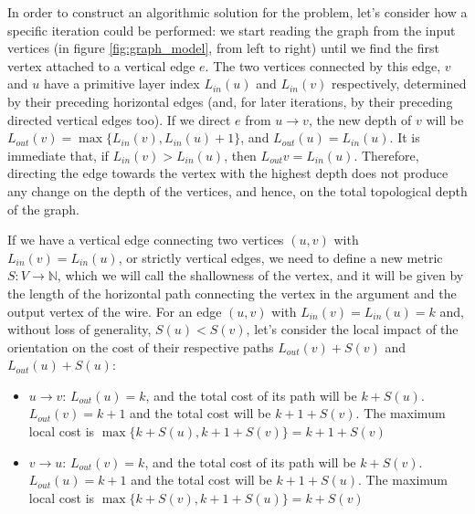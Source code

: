 \documentclass[12pt, twoside, openany]{book}
\begin{document}
In order to construct an algorithmic solution for the problem, let's consider how a specific iteration could be performed: we start reading the graph from the input vertices (in figure \ref{fig:graph_model}, from left to right) until we find the first vertex attached to a vertical edge $e$. The two vertices connected by this edge, $v$ and $u$ have a primitive layer index $L_{in}(u)$ and $L_{in}(v)$ respectively, determined by their preceding horizontal edges (and, for later iterations, by their preceding directed vertical edges too). If we direct $e$ from $u \rightarrow v$, the new depth of $v$ will be $L_{out}(v) = \max \{L_{in}(v), L_{in}(u) + 1\}$, and $L_{out}(u) = L_{in}(u)$. It is immediate that, if $L_{in}(v) > L_{in}(u)$, then $L_{out}{v} = L_{in}(u)$. Therefore, directing the edge towards the vertex with the highest depth does not produce any change on the depth of the vertices, and hence, on the total topological depth of the graph.

If we have a vertical edge connecting two vertices $(u,v)$ with $L_{in}(v) = L_{in}(u)$, or strictly vertical edges, we need to define a new metric $S: V \rightarrow \mathbb{N}$, which we will call the shallowness of the vertex, and it will be given by the length of the horizontal path connecting the vertex in the argument and the output vertex of the wire. For an edge $(u,v)$ with $L_{in}(v) = L_{in}(u) = k$ and, without loss of generality, $S(u) < S(v)$, let's consider the local impact of the orientation on the cost of their respective paths $L_{out}(v) + S(v)$ and $L_{out}(u) + S(u)$:
\begin{itemize}
    \item $u \rightarrow v$: $L_{out}(u) = k$, and the total cost of its path will be $k + S(u)$. $L_{out}(v) = k+1$ and the total cost will be $k+1 + S(v)$. The maximum local cost is $\max \{k + S(u), k + 1 + S(v)\} = k + 1 + S(v) $
    \item $v \rightarrow u$: $L_{out}(v) = k$, and the total cost of its path will be $k + S(v)$. $L_{out}(u) = k+1$ and the total cost will be $k+1 + S(u)$. The maximum local cost is $\max \{k + S(v), k + 1 + S(u)\} = k + S(v) $
\end{itemize}
\end{document}
